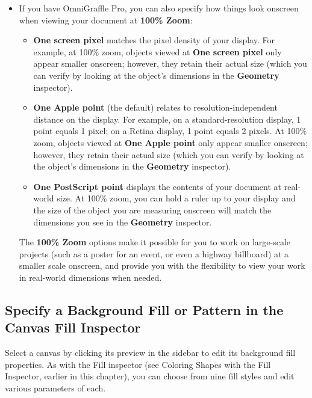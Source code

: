\documentclass[../main.tex]{subfiles}
\begin{document}
\begin{ogpro}
  \begin{itemize}
    \item If you have OmniGraffle Pro, you can also specify how things look onscreen when
      viewing your document at \textbf{100\% Zoom}:

      \begin{itemize}
        \item \textbf{One screen pixel} matches the pixel density of your display. For example, at
          100\% zoom, objects viewed at \textbf{One screen pixel} only appear smaller onscreen;
          however, they retain their actual size (which you can verify by looking at the object's
          dimensions in the \textbf{Geometry} inspector).
        \item \textbf{One Apple point} (the default) relates to resolution-independent distance on
          the display. For example, on a standard-resolution display, 1 point equals 1 pixel; on a
          Retina display, 1 point equals 2 pixels. At 100\% zoom, objects viewed at \textbf{One
          Apple point} only appear smaller onscreen; however, they retain their actual size (which
            you can verify by looking at the object's dimensions in the \textbf{Geometry}
          inspector).
        \item \textbf{One PostScript point} displays the contents of your document at real-world
          size. At 100\% zoom, you can hold a ruler up to your display and the size of the object
          you are measuring onscreen will match the dimensions you see in the \textbf{Geometry}
          inspector.
      \end{itemize}

      The \textbf{100\% Zoom} options make it possible for you to work on large-scale projects
      (such as a poster for an event, or even a highway billboard) at a smaller scale onscreen,
      and provide you with the flexibility to view your work in real-world dimensions when
      needed.
  \end{itemize}
\end{ogpro}

\subsection{Specify a Background Fill or Pattern in the Canvas Fill Inspector}

Select a canvas by clicking its preview in the sidebar to edit its background fill properties.
As with the Fill inspector (see Coloring Shapes with the Fill Inspector, earlier in this
chapter), you can choose from nine fill styles and edit various parameters of each.
\end{document}
